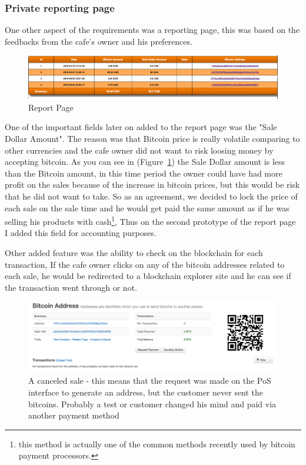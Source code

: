 \subsubsection{Private reporting page}
One other aspect of the requirements was a reporting page, this was based on the feedbacks from the cafe's owner and his preferences.

\begin{figure}[htb!p]
\centering
\includegraphics[width=\linewidth]{fig/report_page.png}
  \caption{Report Page}
\label{fig:report_page}
\end{figure}

One of the important fields later on added to the report page was the "Sale Dollar Amount". The reason was that Bitcoin price is really volatile comparing to other currencies and the cafe owner did not want to risk loosing money by accepting bitcoin. As you can see in (Figure~\ref{fig:report_page}) the Sale Dollar amount is less than the Bitcoin amount, in this time period the owner could have had more profit on the sales because of the increase in bitcoin prices, but this would be risk that he did not want to take. So as an agreement, we decided to lock the price of each sale on the sale time and he would get paid the same amount as if he was selling his products with cash\footnote{this method is actually one of the common methods recently used by bitcoin payment processors.}, Thus on the second prototype of the report page I added this field for accounting purposes.

Other added feature was the ability to check on the blockchain for each transaction, If the cafe owner clicks on any of the bitcoin addresses related to each sale, he would be redirected to a blockchain explorer site and he can see if the transaction went through or not.

\begin{figure}[htb!p]
\centering
\includegraphics[width=\linewidth]{fig/canceled_sale.png}
  \caption{A canceled sale - this means that the request was made on the PoS interface to generate an address, but the customer never sent the bitcoins. Probably a test or customer changed his mind and paid via another payment method}
\label{fig:canceled_sale}
\end{figure}


